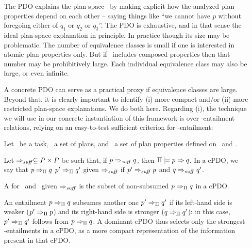 The PDO explains the plan space \plans\ by making explicit how the
analyzed plan properties depend on each other -- saying things like
``we cannot have $p$ without foregoing either of $q_1$ or $q_2$ or
$q_3$''. The PDO is exhaustive, and in that sense the ideal plan-space
explanation in principle. In practice though its size may be
problematic. The number of equivalence classes is small if one is
interested in atomic plan properties only. But if \props\ includes
composed properties then that number may be prohibitively large. Each
individual equivalence class may also be large, or even infinite.

A concrete PDO can serve as a practical proxy if equivalence classes
are large. Beyond that, it is clearly important to identify (i) more
compact and/or (ii) more restricted plan-space explanations. We do
both here. Regarding (i), the technique we will use in our concrete
instantiation of this framework is  over
\plans-entailment relations, relying on an easy-to-test sufficient
criterion for \plans-entailment:

\begin{definition}\label{def:dcpdo}
Let \task\ be a task, \plans\ a set of plans, and \props\ a set of
plan properties defined on \task\ and \plans.

Let $\Rightarrow_{\mathit{suff}} \subseteq P \times P$ be such that, if $p
\Rightarrow_{\mathit{suff}} q$, then $\Pi \models p \Rightarrow q$.
%
In a cPDO, we say that $p \Rightarrow_{\Pi} q$ 
$p' \Rightarrow_{\Pi} q'$ given $\Rightarrow_{\mathit{suff}}$ if $p'
\Rightarrow_{\mathit{suff}} p$ and $q \Rightarrow_{\mathit{suff}} q'$.

A  for \plans\ and \props\ given
$\Rightarrow_{\mathit{suff}}$ is the subset of non-subsumed $p \Rightarrow_{\Pi} q$
in a cPDO.
%
\end{definition}

An entailment $p \Rightarrow_{\Pi} q$ subsumes another one $p'
\Rightarrow_{\Pi} q'$ if its left-hand side is weaker ($p'
\Rightarrow_{\Pi} p$) and its right-hand side is stronger ($q
\Rightarrow_{\Pi} q'$): in this case, $p' \Rightarrow_{\Pi} q'$
follows from $p \Rightarrow_{\Pi} q$. A dominant cPDO thus selects
only the strongest \plans-entailments in a cPDO, as a more compact
representation of the information present in that cPDO.
%

